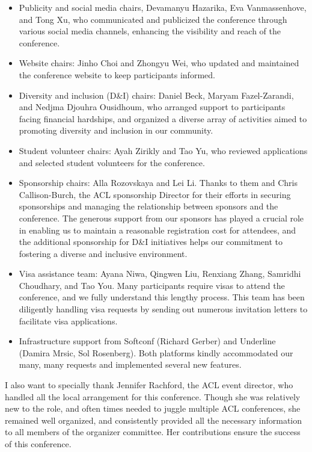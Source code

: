 \begin{itemize}
\item Publicity and social media chairs, Devamanyu Hazarika, Eva Vanmassenhove, and Tong Xu, who communicated and publicized the conference through various social media channels, enhancing the visibility and reach of the conference.
\item Website chairs: Jinho Choi and Zhongyu Wei, who updated and maintained the conference website to keep participants informed.
\item Diversity and inclusion (D\&I) chairs: Daniel Beck, Maryam Fazel-Zarandi, and Nedjma Djouhra Ousidhoum, who arranged support to participants facing financial hardships, and organized a diverse array of activities aimed to promoting diversity and inclusion in our community.
\item Student volunteer chairs: Ayah Zirikly and Tao Yu, who reviewed applications and selected student volunteers for the conference. 
\item Sponsorship chairs: Alla Rozovskaya and Lei Li. Thanks to them and Chris Callison-Burch, the ACL sponsorship Director for their efforts in securing sponsorships and managing the relationship between sponsors and the conference. The generous support from our sponsors has played a crucial role in enabling us to maintain a reasonable registration cost for attendees, and the additional sponsorship for D\&I initiatives helps our commitment to fostering a diverse and inclusive environment.
\item Visa assistance team: Ayana Niwa, Qingwen Liu, Renxiang Zhang, Samridhi Choudhary, and Tao You. Many participants require visas to attend the conference, and we fully understand this lengthy process. This team has been diligently handling visa requests by sending out numerous invitation letters to facilitate visa applications.
\item Infrastructure support from Softconf (Richard Gerber) and Underline (Damira Mrsic, Sol Rosenberg). Both platforms kindly accommodated our many, many requests and implemented several new features.
\end{itemize}
 
I also want to specially thank Jennifer Rachford, the ACL event director, who handled all the local arrangement for this conference. Though she was relatively new to the role, and often times needed to juggle multiple ACL conferences, she remained well organized, and consistently provided all the necessary information to all members of the organizer committee. Her contributions ensure the success of this conference.

